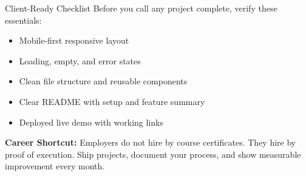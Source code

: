 \documentclass[12pt,a4paper]{article}
\begin{document}
\begin{infobox}{Client-Ready Checklist}
Before you call any project complete, verify these essentials:
\begin{itemize}[leftmargin=1.5em, itemsep=4pt]
    \item[\ding{116}] Mobile-first responsive layout
    \item[\ding{116}] Loading, empty, and error states
    \item[\ding{116}] Clean file structure and reusable components
    \item[\ding{116}] Clear README with setup and feature summary
    \item[\ding{116}] Deployed live demo with working links
\end{itemize}
\end{infobox}

\begin{tipbox}
\textbf{Career Shortcut:} Employers do not hire by course certificates. They hire by proof of execution. Ship projects, document your process, and show measurable improvement every month.
\end{tipbox}
\end{document}
